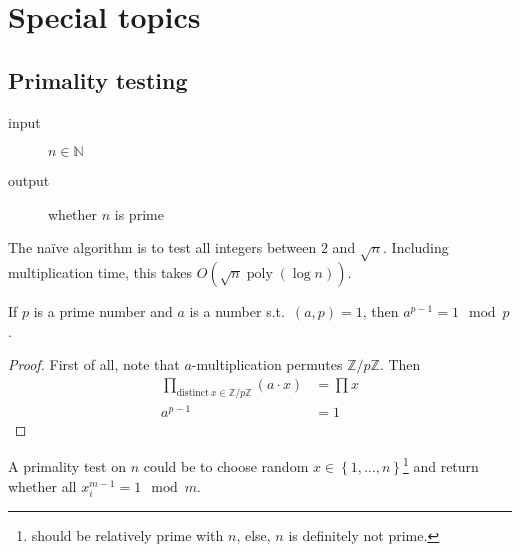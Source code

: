 \chapter{Special topics}
\section{Primality testing}
\begin{description}
	\item[input] \(n\in \mathbb{N}\)
	\item[output] whether \(n\) is prime
\end{description}
The na\"ive algorithm is to test all integers between \(2\) and \(\sqrt{n}\).
Including multiplication time, this takes \(O\left(\sqrt{n} \operatorname{poly}\left(\log n\right)\right)\).

\begin{theorem}
	If \(p\) is a prime number and \(a\) is a number s.t.~\((a, p) = 1\), then \(a^{p - 1} = 1 \mod p\).
\end{theorem}
\begin{proof}
	First of all, note that \(a\)-multiplication permutes \(\mathbb{Z}/p\mathbb{Z}\).
	Then
	\begin{align}
		\prod_{\text{distinct}\ x\in \mathbb{Z}/p\mathbb{Z}}\left(a\cdot x\right) &= \prod x \\
		a^{p - 1} &= 1
	\end{align}
\end{proof}
A primality test on \(n\) could be to choose random \(x \in \left\{1,\ldots, n\right\}\)\footnote{should be relatively prime with \(n\), else, \(n\) is definitely not prime.} and return whether all \(x_i^{m - 1} = 1 \mod m\).

